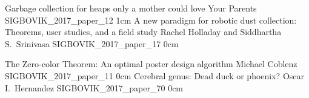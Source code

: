 \addpaper
	{Garbage collection for heaps only a mother could love}
	{Your Parents}
	{}
	{SIGBOVIK_2017_paper_12}
	{1cm}
	{}
\addpaper
	{A new paradigm for robotic dust collection: Theorems, user studies, and a field study}
	{Rachel Holladay and Siddhartha S.\ Srinivasa}
	{}
	{SIGBOVIK_2017_paper_17}
	{0cm}
	{}

\addpaper
	{The Zero-color Theorem: An optimal poster design algorithm}
	{Michael Coblenz}
	{}
	{SIGBOVIK_2017_paper_11}
	{0cm}
	{}
\addpaper
	{Cerebral genus: Dead duck or phoenix?}
	{Oscar I.\ Hernandez}
	{}
	{SIGBOVIK_2017_paper_70}
	{0cm}
	{}
